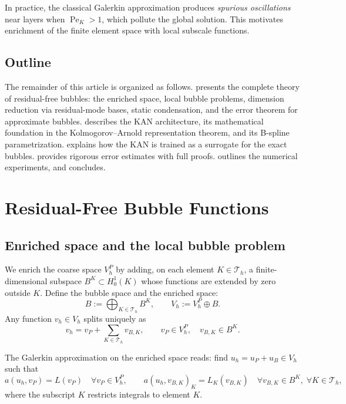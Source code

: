 \documentclass[11pt]{article}
\newcommand{\Th}{\mathcal{T}_h}
\newcommand{\Vh}{V_h}
\newcommand{\Vp}{V_h^P}
\newcommand{\Pe}{\operatorname{Pe}}
\theoremstyle{remark}
\begin{document}
In practice, the classical Galerkin approximation produces \emph{spurious oscillations} near layers when $\Pe_K > 1$, which pollute the global solution. This motivates enrichment of the finite element space with local subscale functions.

\subsection{Outline}

The remainder of this article is organized as follows.  presents the complete theory of residual-free bubbles: the enriched space, local bubble problems, dimension reduction via residual-mode bases, static condensation, and the error theorem for approximate bubbles.  describes the KAN architecture, its mathematical foundation in the Kolmogorov--Arnold representation theorem, and its B-spline parametrization.  explains how the KAN is trained as a surrogate for the exact bubbles.  provides rigorous error estimates with full proofs.  outlines the numerical experiments, and  concludes.

\section{Residual-Free Bubble Functions}
\label{sec:RFB}

\subsection{Enriched space and the local bubble problem}

We enrich the coarse space $\Vp$ by adding, on each element $K \in \Th$, a finite-dimensional subspace $B^K \subset H_0^1(K)$ whose functions are extended by zero outside $K$. Define the bubble space and the enriched space:
\begin{equation}\label{eq:BK_def}
B := \bigoplus_{K \in \Th} B^K, \qquad \Vh := \Vp \oplus B.
\end{equation}
Any function $v_h \in \Vh$ splits uniquely as
\begin{equation}
v_h = v_P + \sum_{K \in \Th} v_{B,K}, \qquad v_P \in \Vp,\quad v_{B,K} \in B^K.
\end{equation}

The Galerkin approximation on the enriched space reads: find $u_h = u_P + u_B \in \Vh$ such that
\begin{equation}\label{eq:enriched_split}
a(u_h, v_P) = L(v_P) \quad \forall v_P \in \Vp,
\qquad
a(u_h, v_{B,K})_K = L_K(v_{B,K}) \quad \forall v_{B,K} \in B^K,\;\forall K \in \Th,
\end{equation}
where the subscript $K$ restricts integrals to element $K$.
\end{document}
